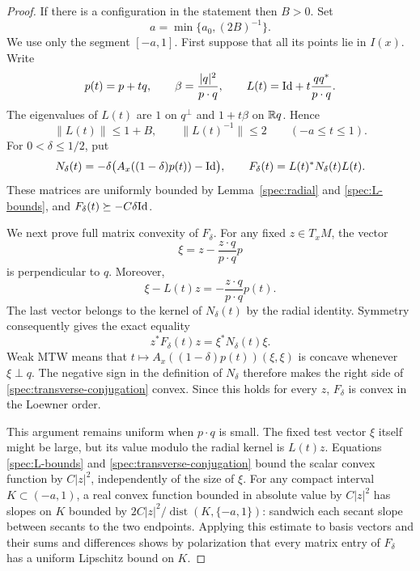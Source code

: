 \begin{proof}
If there is a configuration in the statement then $B>0$.  Set
\[
  a=\min\{a_0,(2B)^{-1}\}.
\]
We use only the segment $[-a,1]$.  First suppose that all its
points lie in $I(x)$.  Write
\[
  p(t)=p+tq,\qquad \beta=\frac{|q|^2}{p\cdot q},\qquad
  L(t)=\mathrm{Id}+t\frac{qq^*}{p\cdot q}.
\]
The eigenvalues of $L(t)$ are $1$ on $q^\perp$ and $1+t\beta$
on $\mathbb R q$.  Hence
\begin{equation}\label{spec:L-bounds}
  \|L(t)\|\le1+B,\qquad \|L(t)^{-1}\|\le2
       \qquad(-a\le t\le1).
\end{equation}
For $0<\delta\le1/2$, put
\begin{equation}\label{spec:F-definition}
  N_\delta(t)=-\delta\bigl(A_x((1-\delta)p(t))-\mathrm{Id}\bigr),
  \qquad F_\delta(t)=L(t)^*N_\delta(t)L(t).
\end{equation}
These matrices are uniformly bounded by Lemma~\ref{spec:radial}
and \eqref{spec:L-bounds}, and
$F_\delta(t)\succeq-C\delta\mathrm{Id}$.

We next prove full matrix convexity of $F_\delta$.  For any fixed
$z\in T_xM$, the vector
\[
  \xi=z-\frac{z\cdot q}{p\cdot q}p
\]
is perpendicular to $q$.  Moreover,
\[
  \xi-L(t)z=-\frac{z\cdot q}{p\cdot q}p(t).
\]
The last vector belongs to the kernel of $N_\delta(t)$ by the
radial identity.  Symmetry consequently gives the exact equality
\begin{equation}\label{spec:transverse-conjugation}
  z^*F_\delta(t)z=\xi^*N_\delta(t)\xi.
\end{equation}
Weak MTW means that
$t\mapsto A_x((1-\delta)p(t))(\xi,\xi)$ is concave whenever
$\xi\perp q$.  The negative sign in the definition of $N_\delta$
therefore makes the right side of
\eqref{spec:transverse-conjugation} convex.  Since this holds for
every $z$, $F_\delta$ is convex in the Loewner order.

This argument remains uniform when $p\cdot q$ is small.  The
fixed test vector $\xi$ itself might be large, but its value
modulo the radial kernel is $L(t)z$.  Equations
\eqref{spec:L-bounds} and \eqref{spec:transverse-conjugation}
bound the scalar convex function by $C|z|^2$, independently of
the size of $\xi$.  For any compact interval
$K\subset(-a,1)$, a real convex function bounded in absolute
value by $C|z|^2$ has slopes on $K$ bounded by
$2C|z|^2/\operatorname{dist}(K,\{-a,1\})$: sandwich each
secant slope between secants to the two endpoints.  Applying
this estimate to basis vectors and their sums and differences
shows by polarization that every matrix entry of $F_\delta$
has a uniform Lipschitz bound on $K$.


\end{proof}
